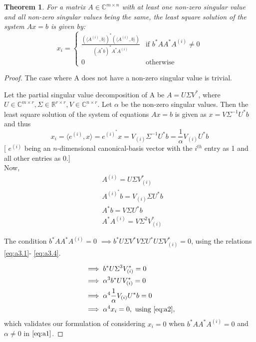 \documentclass[a4paper,fleqn]{cas-sc}
\newtheorem{theorem}{Theorem}[section]      %
\theoremstyle{definition}
\theoremstyle{remark}
\begin{document}
\begin{theorem}\label{thm:direct_solver}
For a matrix $A \in \mathbb{C}^{m\times n}$ with at least one non-zero singular value and all non-zero singular values being the same, the least square solution of the system $Ax=b$ is given by: 
\begin{equation}
x_i =
\begin{cases}
\frac{(\langle A^{(i)}, b\rangle)^*(\langle A^{(i)}, b\rangle)}{(A^{*}b)^{*}A^{*}A^{(i)}} & \text{if } b^{*}AA^{*}A^{(i)} \neq 0 \\
0 & \text{otherwise}
\end{cases}
\label{eq:a1}
\end{equation}
\end{theorem}
\begin{proof}
The case where A does not have a non-zero singular value is trivial.

Let the partial singular value decomposition of A be $A=U\Sigma V^{*}$, where $U \in \mathbb{C}^{m\times r}, \Sigma \in \mathbb{R}^{r\times r}, V \in \mathbb{C}^{n\times r}$. Let $\alpha$ be the non-zero singular values. Then the least square solution of the system of equations $Ax=b$ is given as $x= V\Sigma ^{-1}U^{*}b$ and thus 
\begin{equation}
x_i= \langle e^{(i)},x\rangle=e^{(i)^*}x=V_{(i)}\Sigma ^{-1}U^{*}b=\frac{1}{\alpha}V_{(i)}U^{*}b
\label{eq:a2}
\end{equation}
[ $e^{(i)}$ being an $n$-dimensional canonical-basis vector with the $i^{th}$ entry as 1 and all other entries as 0.]\\

Now, \begin{align}
\label{eq:a3.1}
& A^{(i)}=U\Sigma V_{(i)}^{*}\\ 
\label{eq:a3.2}
 & A^{(i)^{*}}b=V_{(i)}\Sigma U^{*}b\\
 \label{eq:a3.3}
 & A^{*}b=V\Sigma U^{*}b\\
 \label{eq:a3.4}
 & A^{*}A^{(i)}=V \Sigma ^{2}V_{(i)}^{*}
\end{align}

The condition $b^{*}AA^{*}A^{(i)} = 0$ $ \implies b^{*}U\Sigma V^{*}V\Sigma U^{*}U\Sigma V_{(i)}^{*} =0$, using the relations \eqref{eq:a3.1}- \eqref{eq:a3.4}.

\begin{align*}
 & \implies b^{*}U\Sigma ^{3} V_{(i)}^{*} =0 \\
& \implies \alpha ^3 b^*UV_{(i)}^*=0 \\
& \implies \alpha ^4 \frac{1}{\alpha}V_{(i)}U^{*}b=0\\
& \implies \alpha^4 x_i = 0, \text{ using } \eqref{eq:a2},
\end{align*}
which validates our formulation of considering $x_i=0$ when $b^{*}AA^{*}A^{(i)} = 0$ and $\alpha \neq 0$ in $\eqref{eq:a1}$.


\end{proof}
\end{document}
